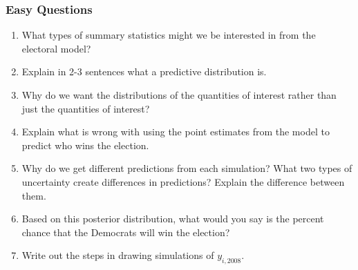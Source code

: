 \documentclass[11pt]{article}
\begin{document}
\subsubsection{Easy Questions}
\begin{enumerate}
\item What types of summary statistics might we be interested in from the electoral model? 
\item Explain in 2-3 sentences what a predictive distribution is. 
\item Why do we want the distributions of the quantities of interest rather than just the quantities of interest?  
\item Explain what is wrong with using the point estimates from the model to predict who wins the election. 
\item Why do we get different predictions from each simulation?  What two types of uncertainty create differences in predictions?  Explain the difference between them. 
\item Based on this posterior distribution, what would you say is the percent chance that the Democrats will win the election? \index%
\begin{center}
\label{fig:nonfloat}
\end{center}
\item Write out the steps in drawing simulations of $y_{i, 2008}$.  
\end{enumerate}
\end{document}
